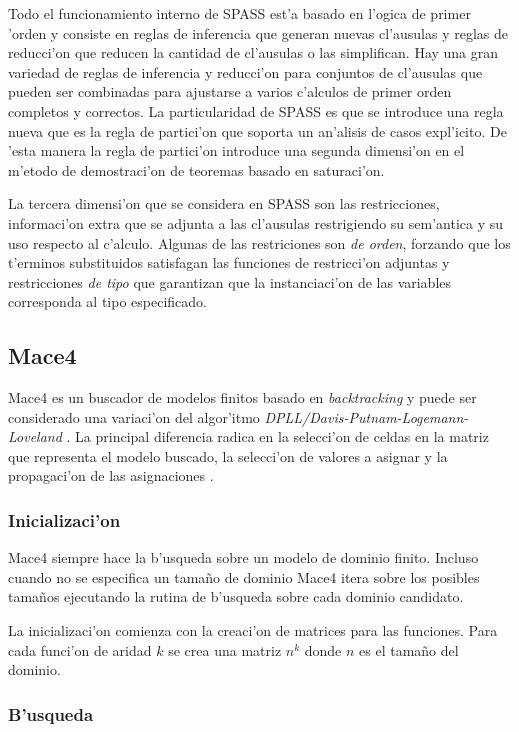 Todo el funcionamiento interno de SPASS est'a basado en l'ogica de primer 'orden y consiste en reglas de inferencia que generan nuevas cl'ausulas y reglas de reducci'on que reducen la cantidad de cl'ausulas o las simplifican. Hay una gran variedad de reglas de inferencia y reducci'on para conjuntos de cl'ausulas que pueden ser combinadas para ajustarse a varios c'alculos de primer orden completos y correctos. La particularidad de SPASS es que se introduce una regla nueva que es la regla de partici'on que soporta un an'alisis de casos expl'icito. De 'esta manera la regla de partici'on introduce una segunda dimensi'on en el m'etodo de demostraci'on de teoremas basado en saturaci'on.

La tercera dimensi'on que se considera en SPASS son las restricciones, informaci'on extra que se adjunta a las cl'ausulas restrigiendo su sem'antica y su uso respecto al c'alculo. Algunas de las restriciones son \textit{de orden}, forzando que los t'erminos substituidos satisfagan las funciones de restricci'on adjuntas y restricciones \textit{de tipo} que garantizan que la instanciaci'on de las variables corresponda al tipo especificado.


\subsection{Mace4}

Mace4 es un buscador de modelos finitos basado en \textit{backtracking} y puede ser considerado una variaci'on del algor'itmo \textit{DPLL/Davis-Putnam-Logemann-Loveland} \cite{dpll}. La principal diferencia radica en la selecci'on de celdas en la matriz que representa el modelo buscado, la selecci'on de valores a asignar y la propagaci'on de las asignaciones \cite{mace4_manual}.

\subsubsection{Inicializaci'on}

Mace4 siempre hace la b'usqueda sobre un modelo de dominio finito. Incluso cuando no se especifica un tamaño de dominio Mace4 itera sobre los posibles tamaños ejecutando la rutina de b'usqueda sobre cada dominio candidato.

La inicializaci'on comienza con la creaci'on de matrices para las funciones. Para cada funci'on de aridad $k$ se crea una matriz $n^k$ donde $n$ es el tamaño del dominio.

\subsubsection{B'usqueda}

